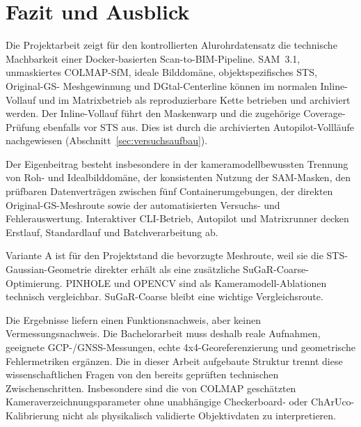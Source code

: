 \section{Fazit und Ausblick}

Die Projektarbeit zeigt für den kontrollierten Alurohrdatensatz die technische
Machbarkeit einer Docker-basierten Scan-to-BIM-Pipeline. SAM~3.1, unmaskiertes
COLMAP-SfM, ideale Bilddomäne, objektspezifisches STS, Original-GS-
Meshgewinnung und DGtal-Centerline können im normalen Inline-Vollauf und im
Matrixbetrieb als reproduzierbare Kette betrieben und archiviert werden. Der
Inline-Vollauf führt den Maskenwarp und die zugehörige Coverage-Prüfung
ebenfalls vor STS aus. Dies ist durch die archivierten Autopilot-Vollläufe
nachgewiesen (Abschnitt~\ref{sec:versuchsaufbau}).

Der Eigenbeitrag besteht insbesondere in der kameramodellbewussten Trennung von
Roh- und Idealbilddomäne, der konsistenten Nutzung der SAM-Masken, den
prüfbaren Datenverträgen zwischen fünf Containerumgebungen, der direkten
Original-GS-Meshroute sowie der automatisierten Versuchs- und
Fehlerauswertung. Interaktiver CLI-Betrieb, Autopilot und Matrixrunner decken
Erstlauf, Standardlauf und Batchverarbeitung ab.

Variante A ist für den Projektstand die bevorzugte Meshroute, weil sie die
STS-Gaussian-Geometrie direkter erhält als eine zusätzliche SuGaR-Coarse-
Optimierung. PINHOLE und OPENCV sind als Kameramodell-Ablationen technisch
vergleichbar. SuGaR-Coarse bleibt eine wichtige Vergleichsroute.

Die Ergebnisse liefern einen Funktionsnachweis, aber keinen
Vermessungsnachweis. Die Bachelorarbeit muss deshalb reale Aufnahmen,
geeignete GCP-/GNSS-Messungen, echte 4x4-Georeferenzierung und geometrische
Fehlermetriken ergänzen. Die in dieser Arbeit aufgebaute Struktur trennt diese
wissenschaftlichen Fragen von den bereits geprüften technischen
Zwischenschritten. Insbesondere sind die von COLMAP geschätzten
Kameraverzeichnungsparameter ohne unabhängige Checkerboard- oder
ChArUco-Kalibrierung nicht als physikalisch validierte Objektivdaten zu
interpretieren.
